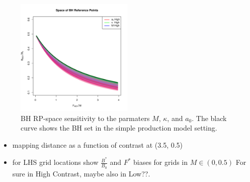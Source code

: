\documentclass[12pt]{article}
\begin{document}
\begin{figure}[h!]
\includegraphics[width=0.5\textwidth]{../ddBias/rpSpace.pdf} 

\vspace{-1cm}
\caption{
BH RP-space sensitivity to the parmaters $M$, $\kappa$, and $a_0$. The black 
curve shows the BH set in the simple production model setting.
}
\label{ddRPs}
\end{figure}
 

\begin{itemize}
\item mapping distance as a function of contrast at (3.5, 0.5)

\item for LHS grid locations show $\frac{B^*}{B_0}$ and $F^*$ biases for grids in $M\in(0,0.5)$ For sure in High Contrast, maybe also in Low??.
\end{itemize}




%
\clearpage

%
\end{document}
